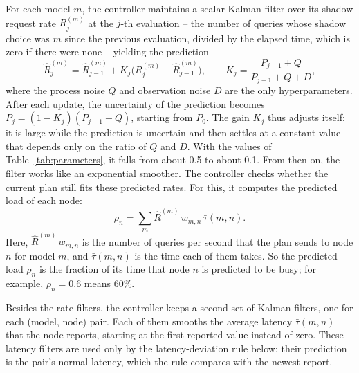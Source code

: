 For each model $m$, the controller maintains a scalar Kalman filter \cite{kalman} over its shadow request rate $R_j^{(m)}$ at the $j$-th evaluation -- the number of queries whose shadow choice was $m$ since the previous evaluation, divided by the elapsed time, which is zero if there were none -- yielding the prediction
$$ \hat{R}_j^{(m)} = \hat{R}_{j-1}^{(m)} + K_j \big( R_j^{(m)} - \hat{R}_{j-1}^{(m)} \big), \qquad K_j = \frac{P_{j-1} + Q}{P_{j-1} + Q + D}, $$
where the process noise $Q$ and observation noise $D$ are the only hyperparameters.
After each update, the uncertainty of the prediction becomes $P_j = (1 - K_j)(P_{j-1} + Q)$, starting from $P_0$.
The gain $K_j$ thus adjusts itself: it is large while the prediction is uncertain and then settles at a constant value that depends only on the ratio of $Q$ and $D$. With the values of Table~\ref{tab:parameters}, it falls from about 0.5 to about 0.1. From then on, the filter works like an exponential smoother.
The controller checks whether the current plan still fits these predicted rates.
For this, it computes the predicted load of each node:
$$ \rho_n = \sum_{m} \hat{R}^{(m)} \, w_{m,n} \, \bar{\tau}(m, n). $$
Here, $\hat{R}^{(m)} \, w_{m,n}$ is the number of queries per second that the plan sends to node $n$ for model $m$, and $\bar{\tau}(m, n)$ is the time each of them takes.
So the predicted load $\rho_n$ is the fraction of its time that node $n$ is predicted to be busy; for example, $\rho_n = 0.6$ means 60\%.

Besides the rate filters, the controller keeps a second set of Kalman filters, one for each (model, node) pair.
Each of them smooths the average latency $\bar{\tau}(m, n)$ that the node reports, starting at the first reported value instead of zero.
These latency filters are used only by the latency-deviation rule below: their prediction is the pair's normal latency, which the rule compares with the newest report.

